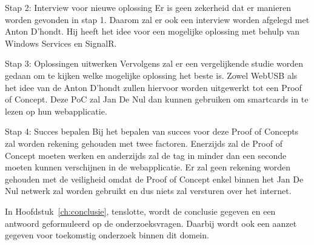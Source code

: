 Stap 2: Interview voor nieuwe oplossing
Er is geen zekerheid dat er manieren worden gevonden in stap 1. Daarom zal er ook een interview worden afgelegd met Anton D'hondt. Hij heeft het idee voor een mogelijke oplossing met behulp van Windows Services en SignalR.

Stap 3: Oplossingen uitwerken
Vervolgens zal er een vergelijkende studie worden gedaan om te kijken welke mogelijke oplossing het beste is. Zowel WebUSB als het idee van de Anton D'hondt zullen hiervoor worden uitgewerkt tot een Proof of Concept. Deze PoC zal Jan De Nul dan kunnen gebruiken om smartcards in te lezen op hun webapplicatie. 

Stap 4: Succes bepalen
Bij het bepalen van succes voor deze Proof of Concepts zal worden rekening gehouden met twee factoren. Enerzijds zal de Proof of Concept moeten werken en anderzijds zal de tag in minder dan een seconde moeten kunnen verschijnen in de webapplicatie. Er zal geen rekening worden gehouden met de veiligheid omdat de Proof of Concept enkel binnen het Jan De Nul netwerk zal worden gebruikt en dus niets zal versturen over het internet.

In Hoofdstuk~\ref{ch:conclusie}, tenslotte, wordt de conclusie gegeven en een antwoord geformuleerd op de onderzoeksvragen. Daarbij wordt ook een aanzet gegeven voor toekomstig onderzoek binnen dit domein.